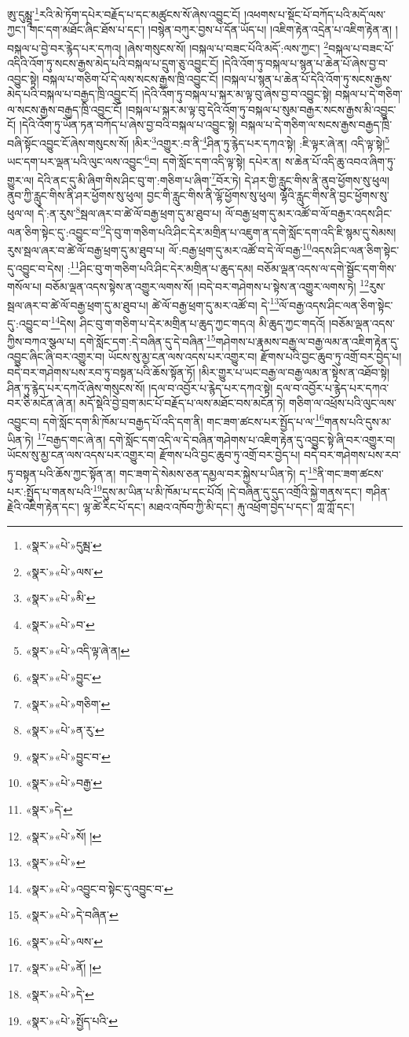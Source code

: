 ཨུ་དུམྺཱ་\footnote{«སྣར་»«པེ་»དུམྦ་}རའི་མེ་ཏོག་དཔེར་བརྗོད་པ་དང་མཚུངས་སོ་ཞེས་འབྱུང་ངོ། །འཕགས་པ་སྡོང་པོ་བཀོད་པའི་མདོ་ལས་ཀྱང་། གང་དག་མཐོང་ཞིང་ཐོས་པ་དང་། །བསྙེན་བཀུར་བྱས་པ་དོན་ཡོད་པ། །འཇིག་རྟེན་འདྲེན་པ་འཇིག་རྟེན་ན། །བསྐལ་པ་བྱེ་བར་རྙེད་པར་དཀའ། །ཞེས་གསུངས་སོ། །བསྐལ་པ་བཟང་པོའི་མདོ་:ལས་ཀྱང་། \footnote{«སྣར་»«པེ་»ལས་}བསྐལ་པ་བཟང་པོ་འདིའི་འོག་ཏུ་སངས་རྒྱས་མེད་པའི་བསྐལ་པ་དྲུག་ཅུ་འབྱུང་ངོ། །དེའི་འོག་ཏུ་བསྐལ་པ་སྙན་པ་ཆེན་པོ་ཞེས་བྱ་བ་འབྱུང་སྟེ། བསྐལ་པ་གཅིག་པོ་དེ་ལས་སངས་རྒྱས་ཁྲི་འབྱུང་ངོ། །བསྐལ་པ་སྙན་པ་ཆེན་པོ་དེའི་འོག་ཏུ་སངས་རྒྱས་མེད་པའི་བསྐལ་པ་བརྒྱད་ཁྲི་འབྱུང་ངོ། །དེའི་འོག་ཏུ་བསྐལ་པ་སྐར་མ་ལྟ་བུ་ཞེས་བྱ་བ་འབྱུང་སྟེ། བསྐལ་པ་དེ་གཅིག་ལ་སངས་རྒྱས་བརྒྱད་ཁྲི་འབྱུང་ངོ། །བསྐལ་པ་སྐར་མ་ལྟ་བུ་དེའི་འོག་ཏུ་བསྐལ་པ་སུམ་བརྒྱར་སངས་རྒྱས་མི་འབྱུང་ངོ། །དེའི་འོག་ཏུ་ཡོན་ཏན་བཀོད་པ་ཞེས་བྱ་བའི་བསྐལ་པ་འབྱུང་སྟེ། བསྐལ་པ་དེ་གཅིག་ལ་སངས་རྒྱས་བརྒྱད་ཁྲི་བཞི་སྟོང་འབྱུང་ངོ་ཞེས་གསུངས་སོ། །མིར་\footnote{«སྣར་»«པེ་»མི་}འགྱུར་:བ་ནི་\footnote{«སྣར་»«པེ་»བ་}ཤིན་ཏུ་རྙེད་པར་དཀའ་སྟེ། :ཇི་ལྟར་ཞེ་ན། འདི་ལྟ་སྟེ།\footnote{«སྣར་»«པེ་»འདི་ལྟ་ཞེ་ན།} ཡང་དག་པར་ལྡན་པའི་ལུང་ལས་འབྱུང་\footnote{«སྣར་»«པེ་»བྱུང་}བ། དགེ་སློང་དག་འདི་ལྟ་སྟེ། དཔེར་ན། ས་ཆེན་པོ་འདི་ཆུ་འབའ་ཞིག་ཏུ་གྱུར་ལ། དེའི་ནང་དུ་མི་ཞིག་གིས་ཤིང་བུ་ག་:གཅིག་པ་ཞིག་\footnote{«སྣར་»«པེ་»གཅིག་}བོར་ཏེ། དེ་ཤར་གྱི་རླུང་གིས་ནི་ནུབ་ཕྱོགས་སུ་ཕུལ། ནུབ་ཀྱི་རླུང་གིས་ནི་ཤར་ཕྱོགས་སུ་ཕུལ། བྱང་གི་རླུང་གིས་ནི་ལྷོ་ཕྱོགས་སུ་ཕུལ། ལྷོའི་རླུང་གིས་ནི་བྱང་ཕྱོགས་སུ་ཕུལ་ལ། དེ་:ན་རུས་\footnote{«སྣར་»«པེ་»ན་རུ་}སྦལ་ཞར་བ་ཚེ་ལོ་བརྒྱ་ཕྲག་དུ་མ་ཐུབ་པ། ལོ་བརྒྱ་ཕྲག་དུ་མར་འཚོ་བ་ལོ་བརྒྱར་འདས་ཤིང་ལན་ཅིག་སྟེང་དུ་:འབྱུང་བ་\footnote{«སྣར་»«པེ་»བྱུང་བ་}དེ་བུ་ག་གཅིག་པའི་ཤིང་དེར་མགྲིན་པ་འཇུག་ན་དགེ་སློང་དག་འདི་ཇི་སྙམ་དུ་སེམས། རུས་སྦལ་ཞར་བ་ཚེ་ལོ་བརྒྱ་ཕྲག་དུ་མ་ཐུབ་པ། ལོ་:བརྒྱ་ཕྲག་དུ་མར་འཚོ་བ་དེ་ལོ་བརྒྱ་\footnote{«སྣར་»«པེ་»བརྒྱ་}འདས་ཤིང་ལན་ཅིག་སྟེང་དུ་འབྱུང་བ་དེས། :\footnote{«སྣར་»དེ་}ཤིང་བུ་ག་གཅིག་པའི་ཤིང་དེར་མགྲིན་པ་ཆུད་དམ། བཅོམ་ལྡན་འདས་ལ་དགེ་སྦྱོང་དག་གིས་གསོལ་པ། བཅོམ་ལྡན་འདས་སྟེས་ན་འགྱུར་ལགས་སོ། །བདེ་བར་གཤེགས་པ་སྟེས་ན་འགྱུར་ལགས་ཏེ། \footnote{«སྣར་»«པེ་»སོ། ། }རུས་སྦལ་ཞར་བ་ཚེ་ལོ་བརྒྱ་ཕྲག་དུ་མ་ཐུབ་པ། ཚེ་ལོ་བརྒྱ་ཕྲག་དུ་མར་འཚོ་བ། དེ་\footnote{«སྣར་»«པེ་»}ལོ་བརྒྱ་འདས་ཤིང་ལན་ཅིག་སྟེང་དུ་:འབྱུང་བ་\footnote{«སྣར་»«པེ་»འབྱུང་བ་སྟེང་དུ་འབྱུང་བ་}དེས། ཤིང་བུ་ག་གཅིག་པ་དེར་མགྲིན་པ་ཆུད་ཀྱང་གདའ། མི་ཆུད་ཀྱང་གདའོ། །བཅོམ་ལྡན་འདས་ཀྱིས་བཀའ་སྩལ་པ། དགེ་སློང་དག་:དེ་བཞིན་དུ་དེ་བཞིན་\footnote{«སྣར་»«པེ་»དེ་བཞིན་}གཤེགས་པ་རྣམས་བརྒྱ་ལ་བརྒྱ་ལམ་ན་འཇིག་རྟེན་དུ་འབྱུང་ཞིང་ཞི་བར་འགྱུར་བ། ཡོངས་སུ་མྱ་ངན་ལས་འདས་པར་འགྱུར་བ། རྫོགས་པའི་བྱང་ཆུབ་ཏུ་འགྲོ་བར་བྱེད་པ། བདེ་བར་གཤེགས་པས་རབ་ཏུ་བསྟན་པའི་ཆོས་སྟོན་ཏོ། །མིར་གྱུར་པ་ཡང་བརྒྱ་ལ་བརྒྱ་ལམ་ན་སྟེས་ན་འཐོབ་སྟེ། ཤིན་ཏུ་རྙེད་པར་དཀའོ་ཞེས་གསུངས་སོ། །དལ་བ་འབྱོར་པ་རྙེད་པར་དཀའ་སྟེ། དལ་བ་འབྱོར་པ་རྙེད་པར་དཀའ་བར་ཅི་མངོན་ཞེ་ན། མདོ་སྡེའི་བྱེ་བྲག་མང་པོ་བརྗོད་པ་ལས་མཐོང་བས་མངོན་ཏེ། གཅིག་ལ་འཕྲོས་པའི་ལུང་ལས་འབྱུང་བ། དགེ་སློང་དག་མི་ཁོམ་པ་བརྒྱད་པོ་འདི་དག་ནི། གང་ཟག་ཚངས་པར་སྤྱོད་པ་ལ་\footnote{«སྣར་»«པེ་»ལས་}གནས་པའི་དུས་མ་ཡིན་ཏེ། \footnote{«སྣར་»«པེ་»ནོ། ། }བརྒྱད་གང་ཞེ་ན། དགེ་སློང་དག་འདི་ལ་དེ་བཞིན་གཤེགས་པ་འཇིག་རྟེན་དུ་འབྱུང་སྟེ་ཞི་བར་འགྱུར་བ། ཡོངས་སུ་མྱ་ངན་ལས་འདས་པར་འགྱུར་བ། རྫོགས་པའི་བྱང་ཆུབ་ཏུ་འགྲོ་བར་བྱེད་པ། བདེ་བར་གཤེགས་པས་རབ་ཏུ་བསྟན་པའི་ཆོས་ཀྱང་སྟོན་ན། གང་ཟག་དེ་སེམས་ཅན་དམྱལ་བར་སྐྱེས་པ་ཡིན་ཏེ། ད་\footnote{«སྣར་»«པེ་»དེ་}ནི་གང་ཟག་ཚངས་པར་:སྤྱོད་པ་གནས་པའི་\footnote{«སྣར་»«པེ་»སྤྱོད་པའི་}དུས་མ་ཡིན་པ་མི་ཁོམ་པ་དང་པོའོ། །དེ་བཞིན་དུ་དུད་འགྲོའི་སྐྱེ་གནས་དང་། གཤིན་རྗེའི་འཇིག་རྟེན་དང་། ལྷ་ཚེ་རིང་པོ་དང་། མཐའ་འཁོབ་ཀྱི་མི་དང་། རྐུ་འཕྲོག་བྱེད་པ་དང་། ཀླ་ཀློ་དང་། 